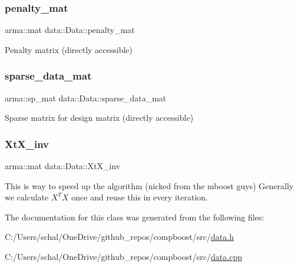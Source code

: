 \subsubsection{\texorpdfstring{penalty\+\_\+mat}{penalty\_mat}}
{\footnotesize\ttfamily arma\+::mat data\+::\+Data\+::penalty\+\_\+mat}



Penalty matrix (directly accessible) 

\mbox{\label{classdata_1_1_data_abc5c5380b4aa8120cdda74195b90955f}} 
\subsubsection{\texorpdfstring{sparse\+\_\+data\+\_\+mat}{sparse\_data\_mat}}
{\footnotesize\ttfamily arma\+::sp\+\_\+mat data\+::\+Data\+::sparse\+\_\+data\+\_\+mat}



Sparse matrix for design matrix (directly accessible) 

\mbox{\label{classdata_1_1_data_a31bdf7564f8589487a0ee9952ebef0c0}} 
\subsubsection{\texorpdfstring{Xt\+X\+\_\+inv}{XtX\_inv}}
{\footnotesize\ttfamily arma\+::mat data\+::\+Data\+::\+Xt\+X\+\_\+inv}

This is way to speed up the algorithm (nicked from the mboost guys) Generally we calculate $X^T X$ once and reuse this in every iteration. 

The documentation for this class was generated from the following files\+:\begin{DoxyCompactItemize}
\item 
C\+:/\+Users/schal/\+One\+Drive/github\+\_\+repos/compboost/src/\mbox{\hyperlink{data_8h}{data.\+h}}\item 
C\+:/\+Users/schal/\+One\+Drive/github\+\_\+repos/compboost/src/\mbox{\hyperlink{data_8cpp}{data.\+cpp}}\end{DoxyCompactItemize}
